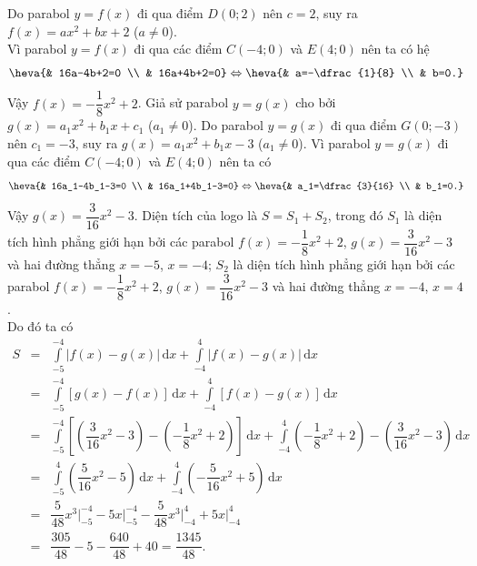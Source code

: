 \begin{ex}
{\begin{itemchoice}
	Do parabol $y=f(x)$ đi qua điểm $D(0;2)$ nên $c=2$, suy ra $f(x)=ax^2+bx+2$ ($a\neq 0$).\\
	Vì parabol $y=f(x)$ đi qua các điểm $C(-4;0)$ và $E(4;0)$ nên ta có hệ
	\begin{align*}
	\heva{& 16a-4b+2=0 \\ & 16a+4b+2=0}\Leftrightarrow \heva{& a=-\dfrac{1}{8} \\ & b=0.}
	\end{align*}
	Vậy $f(x)=-\dfrac{1}{8}x^2+2$.
	\itemch Giả sử parabol $y=g(x)$ cho bởi $g(x)=a_1x^2+b_1x+c_1$ ($a_1\neq 0$). Do parabol $y=g(x)$ đi qua điểm $G(0;-3)$ nên $c_1=-3$, suy ra $g(x)=a_1x^2+b_1x-3$ ($a_1\neq 0$). Vì parabol $y=g(x)$ đi qua các điểm $C(-4;0)$ và $E(4;0)$ nên ta có
	\begin{align*}
	\heva{& 16a_1-4b_1-3=0 \\ & 16a_1+4b_1-3=0}\Leftrightarrow \heva{& a_1=\dfrac{3}{16} \\ & b_1=0.}
	\end{align*}
	Vậy $g(x)=\dfrac{3}{16}x^2-3$.
	\itemch Diện tích của logo là $S=S_1+S_2$, trong đó $S_1$ là diện tích hình phẳng giới hạn bởi các parabol $f(x)=-\dfrac{1}{8}x^2+2$, $g(x)=\dfrac{3}{16}x^{2}-3$ và hai đường thẳng $x=-5$, $x=-4$; $S_2$ là diện tích hình phẳng giới hạn bởi các parabol $f(x)=-\dfrac{1}{8}x^2+2$, $g(x)=\dfrac{3}{16}x^2-3$ và hai đường thẳng $x=-4$, $x=4$.\\
	Do đó ta có
	\begin{eqnarray*}
	S&=&\displaystyle\int\limits_{-5}^{-4} \left|f(x)-g(x)\right| \mathrm{\,d}x+\displaystyle\int\limits_{-4}^{4} \left|f(x)-g(x)\right| \mathrm{\,d}x\\
	&=&\displaystyle\int\limits_{-5}^{-4} \left[g(x)-f(x)\right] \mathrm{\,d}x+\displaystyle\int\limits_{-4}^{4} \left[f(x)-g(x)\right] \mathrm{\,d}x\\
	&=&\displaystyle\int\limits_{-5}^{-4} \left[\left(\dfrac{3}{16}x^2-3\right)-\left(-\dfrac{1}{8}x^2+2\right)\right] \mathrm{\,d}x+\displaystyle\int\limits_{-4}^{4} \left(-\dfrac{1}{8}x^2+2\right)-\left(\dfrac{3}{16}x^2-3\right) \mathrm{\,d}x\\
	&=&\displaystyle\int\limits_{-5}^{4} \left(\dfrac{5}{16}x^2-5\right) \mathrm{\,d}x+\displaystyle\int\limits_{-4}^{4} \left(-\dfrac{5}{16}x^2+5\right) \mathrm{\,d}x\\
	&=&\dfrac{5}{48}x^3\bigg|_{-5}^{-4}-5x\bigg|_{-5}^{-4}-\dfrac{5}{48}x^3\bigg|_{-4}^4+5x\bigg|_{-4}^4\\
	&=&\dfrac{305}{48}-5-\dfrac{640}{48}+40=\dfrac{1345}{48}.
	\end{eqnarray*}
	\end{itemchoice}
	}
\end{ex}
